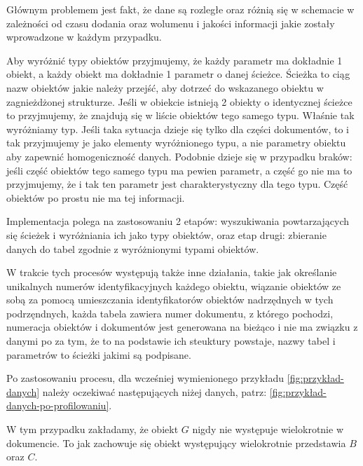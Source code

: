 Głównym problemem jest fakt, że dane są rozległe oraz różnią się 
w schemacie w zależności od czasu dodania oraz wolumenu i jakości informacji
jakie zostały wprowadzone w każdym przypadku.

Aby wyróżnić typy obiektów przyjmujemy, że każdy parametr ma dokładnie 1 obiekt,
a każdy obiekt ma dokładnie 1 parametr o danej ścieżce. Ścieżka to ciąg nazw
obiektów jakie należy przejść, aby dotrzeć do wskazanego obiektu w zagnieżdżonej
strukturze. Jeśli w obiekcie istnieją 2 obiekty o identycznej ścieżce to przyjmujemy,
że znajdują się w liście obiektów tego samego typu. Właśnie tak wyróżniamy typ.
Jeśli taka sytuacja dzieje się tylko dla części dokumentów, to i tak 
przyjmujemy je jako elementy wyróżnionego typu, a nie parametry obiektu
aby zapewnić homogeniczność danych. Podobnie dzieje się w przypadku braków:
jeśli część obiektów tego samego typu ma pewien parametr, a część go nie ma
to przyjmujemy, że i tak ten parametr jest charakterystyczny dla tego typu.
Część obiektów po prostu nie ma tej informacji.

Implementacja polega na zastosowaniu 2 etapów: wyszukiwania powtarzających się
ścieżek i wyróżniania ich jako typy obiektów, oraz etap drugi: zbieranie danych
do tabel zgodnie z wyróżnionymi typami obiektów.

W trakcie tych procesów występują także inne działania, takie jak określanie
unikalnych numerów identyfikacyjnych każdego obiektu, wiązanie obiektów ze sobą
za pomocą umieszczania identyfikatorów obiektów nadrzędnych w tych podrzęndnych,
każda tabela zawiera numer dokumentu, z którego pochodzi, numeracja obiektów i
dokumentów jest generowana na bieżąco i nie ma związku z danymi po za tym, że
to na podstawie ich steuktury powstaje, nazwy tabel i parametrów to ścieżki
jakimi są podpisane.

Po zastosowaniu procesu, dla wcześniej wymienionego przykładu 
\cref{fig:przykład-danych} należy oczekiwać następujących niżej danych, 
patrz: \cref{fig:przykład-danych-po-profilowaniu}.

\begin{uwaga}
W tym przypadku zakładamy, że obiekt $G$ nigdy nie 
występuje wielokrotnie w dokumencie. To jak zachowuje się obiekt
występujący wielokrotnie przedstawia $B$ oraz $C$.
\end{uwaga}

